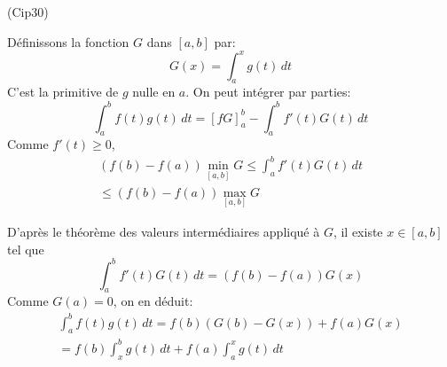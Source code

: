\begin{tiny}(Cip30)\end{tiny} Définissons la fonction $G$ dans $[a,b]$ par:
\begin{displaymath}
 G(x)=\int_a^xg(t)\,dt
\end{displaymath}
C'est la primitive de $g$ nulle en $a$. On peut intégrer par parties:
\begin{displaymath}
 \int_a^bf(t)g(t)\,dt = \left[fG \right]_a^b-\int_a^bf'(t)G(t)\,dt 
\end{displaymath}
Comme $f'(t)\geq0$,
\begin{multline*}
 (f(b)-f(a))\min_{[a,b]}G\leq\int_a^bf'(t)G(t)\,dt \\
\leq (f(b)-f(a))\max_{[a,b]}G
\end{multline*}

D'après le théorème des valeurs intermédiaires appliqué à $G$, il existe $x\in[a,b]$ tel que
\begin{displaymath}
 \int_a^bf'(t)G(t)\,dt = (f(b)-f(a))G(x)
\end{displaymath}
Comme $G(a)=0$, on en déduit:
\begin{multline*}
\int_a^bf(t)g(t)\,dt = f(b)(G(b)-G(x)) +f(a)G(x) \\
= f(b)\int_x^bg(t)\,dt + f(a)\int_a^xg(t)\,dt
\end{multline*}
